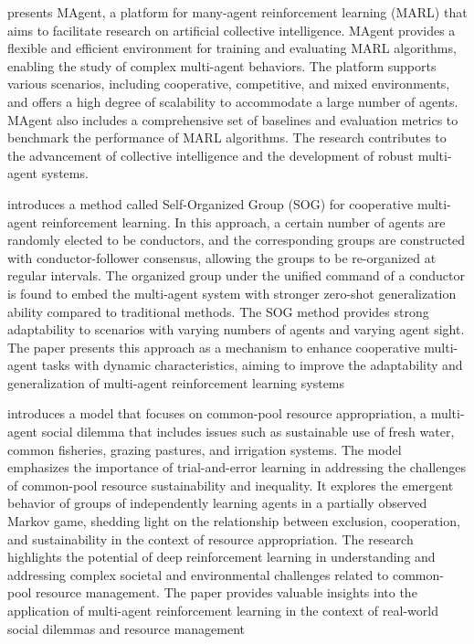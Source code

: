 \documentclass[runningheads]{llncs}
\begin{document}
\cite{Zheng2018} presents MAgent, a platform for many-agent reinforcement learning (MARL) that aims to facilitate research on artificial collective intelligence. MAgent provides a flexible and efficient environment for training and evaluating MARL algorithms, enabling the study of complex multi-agent behaviors. The platform supports various scenarios, including cooperative, competitive, and mixed environments, and offers a high degree of scalability to accommodate a large number of agents. MAgent also includes a comprehensive set of baselines and evaluation metrics to benchmark the performance of MARL algorithms. The research contributes to the advancement of collective intelligence and the development of robust multi-agent systems.

\cite{Shao2022} introduces a method called Self-Organized Group (SOG) for cooperative multi-agent reinforcement learning. In this approach, a certain number of agents are randomly elected to be conductors, and the corresponding groups are constructed with conductor-follower consensus, allowing the groups to be re-organized at regular intervals. The organized group under the unified command of a conductor is found to embed the multi-agent system with stronger zero-shot generalization ability compared to traditional methods. The SOG method provides strong adaptability to scenarios with varying numbers of agents and varying agent sight. The paper presents this approach as a mechanism to enhance cooperative multi-agent tasks with dynamic characteristics, aiming to improve the adaptability and generalization of multi-agent reinforcement learning systems

\cite{Perolat2017} introduces a model that focuses on common-pool resource appropriation, a multi-agent social dilemma that includes issues such as sustainable use of fresh water, common fisheries, grazing pastures, and irrigation systems. The model emphasizes the importance of trial-and-error learning in addressing the challenges of common-pool resource sustainability and inequality. It explores the emergent behavior of groups of independently learning agents in a partially observed Markov game, shedding light on the relationship between exclusion, cooperation, and sustainability in the context of resource appropriation. The research highlights the potential of deep reinforcement learning in understanding and addressing complex societal and environmental challenges related to common-pool resource management. The paper provides valuable insights into the application of multi-agent reinforcement learning in the context of real-world social dilemmas and resource management
\end{document}
